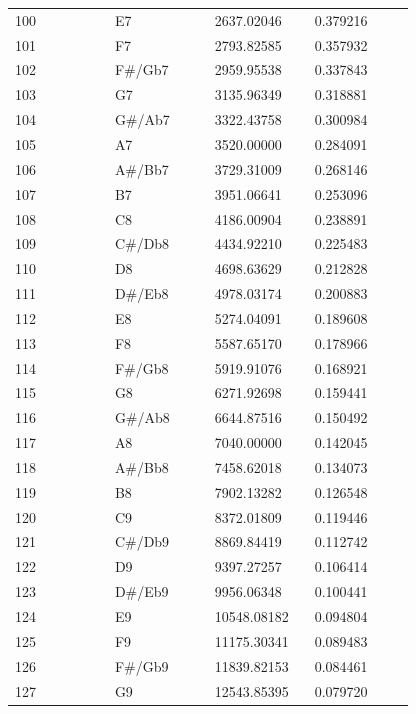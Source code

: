 \documentclass[11pt,a4paper]{article}
\begin{document}
\begin{longtable}{@{}p{0.2200\linewidth}p{0.2200\linewidth}p{0.2200\linewidth}p{0.2200\linewidth}@{}}
100 & E7 & 2637.02046 & 0.379216 \\
101 & F7 & 2793.82585 & 0.357932 \\
102 & F\#/\allowbreak{}Gb7 & 2959.95538 & 0.337843 \\
103 & G7 & 3135.96349 & 0.318881 \\
104 & G\#/\allowbreak{}Ab7 & 3322.43758 & 0.300984 \\
105 & A7 & 3520.00000 & 0.284091 \\
106 & A\#/\allowbreak{}Bb7 & 3729.31009 & 0.268146 \\
107 & B7 & 3951.06641 & 0.253096 \\
108 & C8 & 4186.00904 & 0.238891 \\
109 & C\#/\allowbreak{}Db8 & 4434.92210 & 0.225483 \\
110 & D8 & 4698.63629 & 0.212828 \\
111 & D\#/\allowbreak{}Eb8 & 4978.03174 & 0.200883 \\
112 & E8 & 5274.04091 & 0.189608 \\
113 & F8 & 5587.65170 & 0.178966 \\
114 & F\#/\allowbreak{}Gb8 & 5919.91076 & 0.168921 \\
115 & G8 & 6271.92698 & 0.159441 \\
116 & G\#/\allowbreak{}Ab8 & 6644.87516 & 0.150492 \\
117 & A8 & 7040.00000 & 0.142045 \\
118 & A\#/\allowbreak{}Bb8 & 7458.62018 & 0.134073 \\
119 & B8 & 7902.13282 & 0.126548 \\
120 & C9 & 8372.01809 & 0.119446 \\
121 & C\#/\allowbreak{}Db9 & 8869.84419 & 0.112742 \\
122 & D9 & 9397.27257 & 0.106414 \\
123 & D\#/\allowbreak{}Eb9 & 9956.06348 & 0.100441 \\
124 & E9 & 10548.08182 & 0.094804 \\
125 & F9 & 11175.30341 & 0.089483 \\
126 & F\#/\allowbreak{}Gb9 & 11839.82153 & 0.084461 \\
127 & G9 & 12543.85395 & 0.079720 \\
\bottomrule\end{longtable}\endgroup
\end{document}
